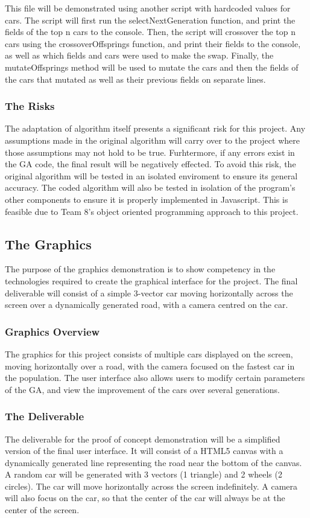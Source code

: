 \documentclass{article}
\begin{document}
This file will be demonstrated using another script with hardcoded values for 
cars. The script will first run the selectNextGeneration function, and print the 
fields of the top n cars to the console. Then, the script will crossover the top 
n cars using the crossoverOffsprings function, and print their fields to the 
console, as well as which fields and cars were used to make the swap. Finally, 
the mutateOffsprings method will be used to mutate the cars and then the fields 
of the cars that mutated as well as their previous fields on separate lines.

\subsubsection{The Risks}
The adaptation of algorithm itself presents a significant risk for this project. Any assumptions made in the original algorithm will carry over to the project where those assumptions may not hold to be true.  Furhtermore, if any errors exist in the GA code, the final result will be negatively effected. To avoid this risk, the original algorithm will be tested in an isolated enviroment to ensure its general accuracy. The coded algorithm will also be tested in isolation of the program's other components to ensure it is properly implemented in Javascript. This is feasible due to Team 8's object oriented programming approach to this project.

\subsection{The Graphics}
The purpose of the graphics demonstration is to show competency in the 
technologies required to create the graphical interface for the project. The 
final deliverable will consist of a simple 3-vector car moving horizontally 
across the screen over a dynamically generated road, with a camera centred on 
the car.

\subsubsection{Graphics Overview}
The graphics for this project consists of multiple cars displayed on the screen, 
moving horizontally over a road, with the camera focused on the fastest car in 
the population. The user interface also allows users to modify certain 
parameters of the GA, and view the improvement of the cars over several 
generations. 

\subsubsection{The Deliverable}
The deliverable for the proof of concept demonstration will be a simplified 
version of the final user interface. It will consist of a HTML5 canvas with a 
dynamically generated line representing the road near the bottom of the canvas. 
A random car will be generated with 3 vectors (1 triangle) and 2 wheels (2 
circles). The car will move horizontally across the screen indefinitely. A 
camera will also focus on the car, so that the center of the car will always be 
at the center of the screen.
\end{document}

